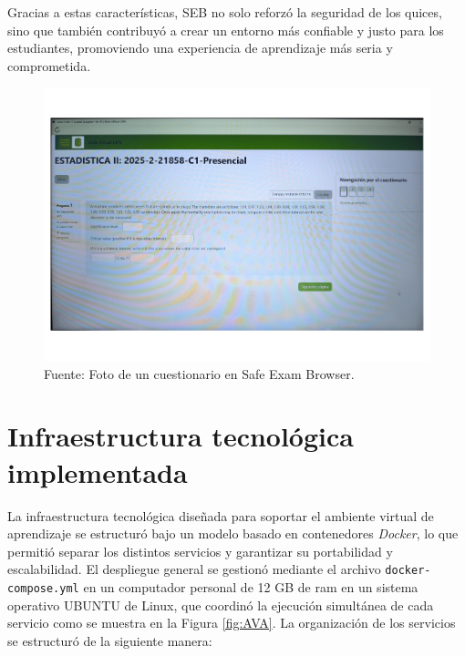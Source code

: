\documentclass[letter,oneside,12pt,spanish]{report}
\begin{document}
Gracias a estas características, SEB no solo reforzó la seguridad de los quices, sino que también contribuyó a crear un entorno más confiable y justo para los estudiantes, promoviendo una experiencia de aprendizaje más seria y comprometida.

\begin{figure}[ht]
	\centering
	\includegraphics[width=1\textwidth]{Figs/SEB.pdf}
	\label{fig:SEB}
	\\Fuente: Foto de un cuestionario en Safe Exam Browser.
\end{figure}

\section{Infraestructura tecnológica implementada}

La infraestructura tecnológica diseñada para soportar el ambiente virtual de aprendizaje se estructuró bajo un modelo basado en contenedores \textit{Docker}, lo que permitió separar los distintos servicios y garantizar su portabilidad y escalabilidad. El despliegue general se gestionó mediante el archivo \texttt{docker-compose.yml} en un computador personal de 12 GB de ram en un sistema operativo UBUNTU de Linux, que coordinó la ejecución simultánea de cada servicio como se muestra en la Figura \ref{fig:AVA}. La organización de los servicios se estructuró de la siguiente manera:
\end{document}
